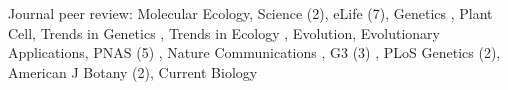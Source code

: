 \documentclass[letterpaper,10pt]{article}
\newcommand{\ignore}[1]{}
\renewenvironment{itemize}{
  \begin{list}{}{
    \setlength{\leftmargin}{1.5em}
  }
}{
  \end{list}
}
\begin{document}
\begin{itemize}
\item Journal peer review:   \ignore{10/24} Molecular Ecology, \ignore{10/23,10/24} Science (2),   \ignore{2/22,5/22,6/22,2/24,7/23,9/23,2/24} eLife (7),  Genetics \ignore{10/22}, \ignore{2/22} Plant Cell,  Trends in Genetics \ignore{9/21}, Trends in Ecology \ignore{9/21}, \ignore{9/2023} Evolution, \ignore{9/23} Evolutionary Applications, PNAS (5) \ignore{7/21,1/22,5/24,6/24,10/24},  Nature Communications \ignore{10/24}, G3 (3) \ignore{12/22,3/22,11/21,9/21}, \ignore{12/23,8/2023} PLoS Genetics (2), \ignore{8/2021,8/22} American J Botany (2), Current Biology \ignore{1/22}
\end{itemize}
\end{document}
